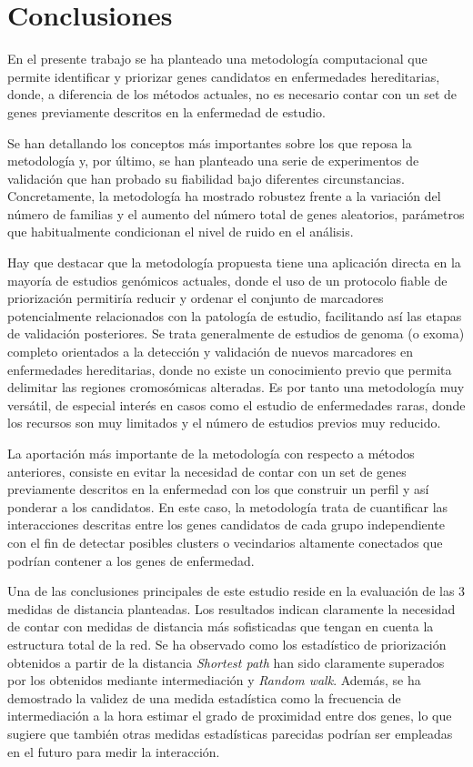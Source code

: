\chapter{Conclusiones}

En el presente trabajo se ha planteado una metodología computacional que permite identificar y priorizar genes candidatos en enfermedades hereditarias, donde, a diferencia de los métodos actuales, no es necesario contar con un set de genes previamente descritos en la enfermedad de estudio.

\medskip
Se han detallando los conceptos más importantes sobre los que reposa la metodología y, por último, se han planteado una serie de experimentos de validación que han probado su fiabilidad bajo diferentes circunstancias. Concretamente, la metodología ha mostrado robustez frente a la variación del número de familias y el aumento del número total de genes aleatorios, parámetros que habitualmente condicionan el nivel de ruido en el análisis.

\medskip
Hay que destacar que la metodología propuesta tiene una aplicación directa en la mayoría de estudios genómicos actuales, donde el uso de un protocolo fiable de priorización permitiría reducir y ordenar el conjunto de marcadores potencialmente relacionados con la patología de estudio, facilitando así las etapas de validación posteriores. Se trata generalmente de estudios de genoma (o exoma) completo orientados a la detección y validación de nuevos marcadores en enfermedades hereditarias, donde no existe un conocimiento previo que permita delimitar las regiones cromosómicas alteradas. Es por tanto una metodología muy versátil, de especial interés en casos como el estudio de enfermedades raras, donde los recursos son muy limitados y el número de estudios previos muy reducido.

\medskip
La aportación más importante de la metodología con respecto a métodos anteriores, consiste en evitar la necesidad de contar con un set de genes previamente descritos en la enfermedad con los que construir un perfil y así ponderar a los candidatos. En este caso, la metodología trata de cuantificar las interacciones descritas entre los genes candidatos de cada grupo independiente con el fin de detectar posibles clusters o vecindarios altamente conectados que podrían contener a los genes de enfermedad. 

\medskip
Una de las conclusiones principales de este estudio reside en la evaluación de las 3 medidas de distancia planteadas. Los resultados indican claramente la necesidad de contar con medidas de distancia más sofisticadas que tengan en cuenta la estructura total de la red. Se ha observado como los estadístico de priorización obtenidos a partir de la distancia \emph{Shortest path} han sido claramente superados por los obtenidos mediante intermediación y \emph{Random walk}. Además, se ha demostrado la validez de una medida estadística como la frecuencia de intermediación a la hora estimar el grado de proximidad entre dos genes, lo que sugiere que también otras medidas estadísticas parecidas podrían ser empleadas en el futuro para medir la interacción.

